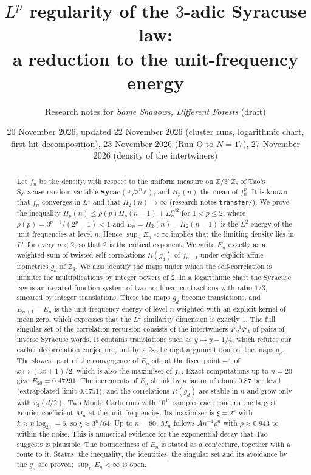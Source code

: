 \documentclass[11pt]{article}
\title{$L^p$ regularity of the $3$-adic Syracuse law:\\ a reduction to the unit-frequency energy}
\author{Research notes for \emph{Same Shadows, Different Forests} (draft)}
\date{20 November 2026, updated 22 November 2026 (cluster runs, logarithmic chart, first-hit decomposition), 23 November 2026 (Run O to $N=17$), 27 November 2026 (density of the intertwiners)}
\theoremstyle{remark}
\newcommand{\Z}{\mathbb Z}
\begin{document}
\maketitle

\begin{abstract}
Let $f_n$ be the density, with respect to the uniform measure on $\Z/3^n\Z$, of Tao's Syracuse random variable $\mathbf{Syrac}(\Z/3^n\Z)$, and $H_p(n)$ the mean of $f_n^p$. It is known that $f_n$ converges in $L^1$ \cite{Tao} and that $H_2(n)\to\infty$ (research notes \texttt{transfer/}). We prove the inequality $H_p(n)\le\rho(p)H_p(n-1)+E_n^{p/2}$ for $1<p\le2$, where $\rho(p)=3^{p-1}/(2^p-1)<1$ and $E_n=H_2(n)-H_2(n-1)$ is the $L^2$ energy of the unit frequencies at level $n$. Hence $\sup_nE_n<\infty$ implies that the limiting density lies in $L^p$ for every $p<2$, so that $2$ is the critical exponent. We write $E_n$ exactly as a weighted sum of twisted self-correlations $R(g_d)$ of $f_{n-1}$ under explicit affine isometries $g_d$ of $\Z_3$. We also identify the maps under which the self-correlation is infinite: the multiplications by integer powers of $2$. In a logarithmic chart the Syracuse law is an iterated function system of two nonlinear contractions with ratio $1/3$, smeared by integer translations. There the maps $g_d$ become translations, and $E_{n+1}-E_n$ is the unit-frequency energy of level $n$ weighted with an explicit kernel of mean zero, which expresses that the $L^2$ similarity dimension is exactly $1$. The full singular set of the correlation recursion consists of the intertwiners $\Psi_B^{-1}\Psi_A$ of pairs of inverse Syracuse words. It contains translations such as $y\mapsto y-1/4$, which refutes our earlier decorrelation conjecture, but by a $2$-adic digit argument none of the maps $g_d$. The slowest part of the convergence of $E_n$ sits at the fixed point $-1$ of $x\mapsto(3x+1)/2$, which is also the maximiser of $f_n$. Exact computations up to $n=20$ give $E_{20}=0.47291$. The increments of $E_n$ shrink by a factor of about $0.87$ per level (extrapolated limit $0.4751$), and the correlations $R(g_d)$ are stable in $n$ and grow only with $v_3(d/2)$. Two Monte Carlo runs with $10^{11}$ samples each concern the largest Fourier coefficient $M_n$ at the unit frequencies. Its maximiser is $\xi=2^k$ with $k\approx n\log_23-6$, so $\xi\approx3^n/64$. Up to $n=80$, $M_n$ follows $An^{-1}\rho^n$ with $\rho\approx0.943$ to within the noise. This is numerical evidence for the exponential decay that Tao suggests is plausible. The boundedness of $E_n$ is stated as a conjecture, together with a route to it. Status: the inequality, the identities, the singular set and its avoidance by the $g_d$ are proved; $\sup_nE_n<\infty$ is open.
\end{abstract}
\end{document}
